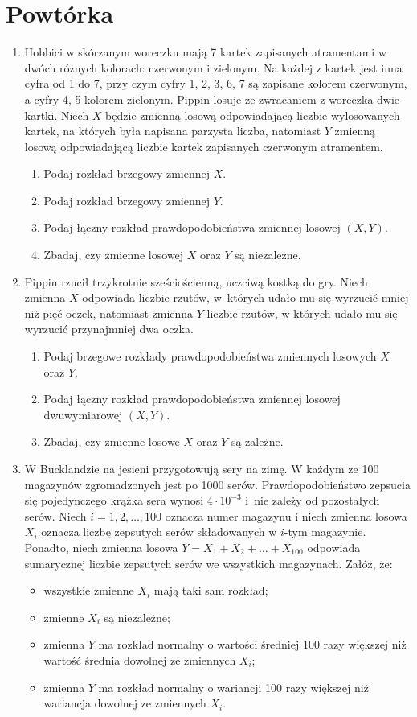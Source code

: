 \documentclass[twoside]{mwart}
\begin{document}
\section{Powtórka}
\begin{enumerate}
\item Hobbici w skórzanym woreczku mają 7 kartek zapisanych atramentami w dwóch różnych kolorach: czerwonym i zielonym.
Na każdej z kartek jest inna cyfra od 1 do 7, przy czym cyfry 1, 2, 3, 6, 7 są zapisane kolorem czerwonym, a cyfry 4, 5 kolorem zielonym.
Pippin losuje ze zwracaniem z woreczka dwie kartki.
Niech $X$ będzie zmienną losową odpowiadającą liczbie wylosowanych kartek, na których była napisana parzysta liczba, natomiast $Y$ zmienną losową odpowiadającą liczbie kartek zapisanych czerwonym atramentem.
\begin{enumerate}
\item Podaj rozkład brzegowy zmiennej $X$.
\item Podaj rozkład brzegowy zmiennej $Y$.
\item Podaj łączny rozkład prawdopodobieństwa zmiennej losowej $(X,Y)$.
\item Zbadaj, czy zmienne losowej $X$ oraz $Y$ są niezależne.
\end{enumerate}
\item Pippin rzucił trzykrotnie sześciościenną, uczciwą kostką do gry. Niech zmienna $X$ odpowiada liczbie rzutów, w~których udało mu się wyrzucić mniej niż pięć
oczek, natomiast zmienna $Y$ liczbie rzutów, w których udało mu się wyrzucić przynajmniej dwa oczka.
\begin{enumerate}
\item Podaj brzegowe rozkłady prawdopodobieństwa zmiennych losowych $X$ oraz $Y$.
\item Podaj łączny rozkład prawdopodobieństwa zmiennej losowej dwuwymiarowej $(X,Y)$.
\item Zbadaj, czy zmienne losowe $X$ oraz $Y$ są zależne.
\end{enumerate}
\item W Bucklandzie na jesieni przygotowują sery na zimę. W każdym ze 100 magazynów
zgromadzonych jest po 1000 serów. Prawdopodobieństwo zepsucia się pojedynczego
krążka sera wynosi $4\cdot 10^{-3}$ i~nie zależy od pozostałych serów. Niech
$i=1,2,\ldots,100$ oznacza numer magazynu i niech zmienna losowa $X_i$ oznacza
liczbę zepsutych serów składowanych w $i$-tym magazynie. Ponadto, niech zmienna
losowa $Y=X_1+X_2+\ldots+X_{100}$ odpowiada sumarycznej liczbie zepsutych serów
we wszystkich magazynach. Załóż, że:
\begin{itemize}
\item wszystkie zmienne $X_i$ mają taki sam rozkład;
\item zmienne $X_i$ są niezależne;
\item zmienna $Y$ ma rozkład normalny o wartości średniej 100 razy większej niż wartość średnia dowolnej ze zmiennych $X_i$;
\item zmienna $Y$ ma rozkład normalny o wariancji 100 razy większej niż wariancja dowolnej ze zmiennych $X_i$.
\end{itemize}


\end{enumerate}
\end{document}
